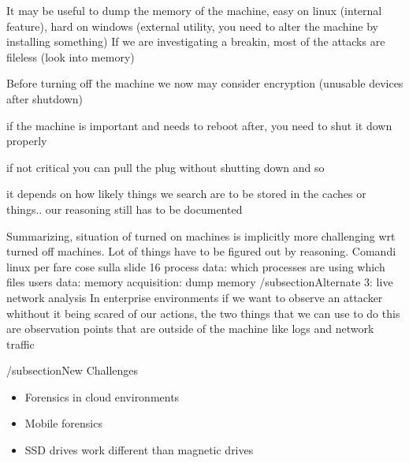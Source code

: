        It may be useful to dump the memory of the machine, easy on linux (internal feature), hard on windows (external utility, you need to alter the machine by installing something)
        If we are investigating a breakin, most of the attacks are fileless (look into memory)

        Before turning off the machine we now may consider encryption (unusable devices after shutdown)

        if the machine is important and needs to reboot after, you need to shut it down properly 

        if not critical you can pull the plug without shutting down and so 

        it depends on how likely things we search are to be stored in the caches or things..
        our reasoning still has to be documented

        Summarizing, situation of turned on machines is implicitly more challenging wrt turned off machines. Lot of things have to be figured out by reasoning.
        Comandi linux per fare cose sulla slide 16
            process data: which processes are using which files
            users data:
            memory acquisition: dump memory 
    /subsection{Alternate 3: live network analysis}
        In enterprise environments if we want to observe an attacker whithout it being scared of our actions, the two things that we can use to do this are observation points that are outside of the machine like logs and network traffic 

    /subsection{New Challenges}
        \begin{itemize}
            \item Forensics in cloud environments
            \item Mobile forensics
            \item SSD drives work different than magnetic drives
        \end{itemize}
